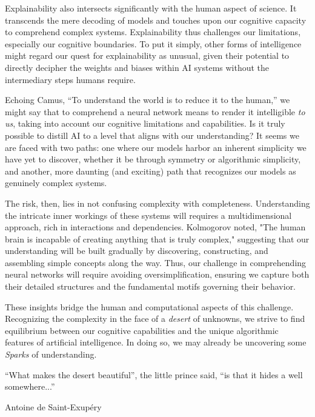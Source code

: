 Explainability also intersects significantly with the human aspect of science. It transcends the mere decoding of models and touches upon our cognitive capacity to comprehend complex systems. Explainability thus challenges our limitations, especially our cognitive boundaries. To put it simply, other forms of intelligence might regard our quest for explainability as unusual, given their potential to directly decipher the weights and biases within AI systems without the intermediary steps humans require.

Echoing Camus, ``To understand the world is to reduce it to the human,'' we might say that to comprehend a neural network means to render it intelligible \textit{to us}, taking into account our cognitive limitations and capabilities. Is it truly possible to distill AI to a level that aligns with our understanding? It seems we are faced with two paths: one where our models harbor an inherent simplicity we have yet to discover, whether it be through symmetry or algorithmic simplicity, and another, more daunting (and exciting) path that recognizes our models as genuinely complex systems. 

The risk, then, lies in not confusing complexity with completeness. Understanding the intricate inner workings of these systems will requires a multidimensional approach, rich in interactions and dependencies. Kolmogorov noted, "The human brain is incapable of creating anything that is truly complex," suggesting that our understanding will be built gradually by discovering, constructing, and assembling simple concepts along the way. Thus, our challenge in comprehending neural networks will require avoiding oversimplification, ensuring we capture both their detailed structures and the fundamental motifs governing their behavior.

\vspace{0mm}
{
\begin{center} 
\Large {} 
\end{center}
}
\vspace{0mm}

These insights bridge the human and computational aspects of this challenge. Recognizing the complexity in the face of a \textit{desert} of unknowns, we strive to find equilibrium between our cognitive capabilities and the unique algorithmic features of artificial intelligence. In doing so, we may already be uncovering some \textit{Sparks} of understanding.

\vspace{0mm}

\epigraph{``What makes the desert beautiful'', the little prince said, ``is that it hides a well somewhere...''}{Antoine de Saint-Exupéry}
